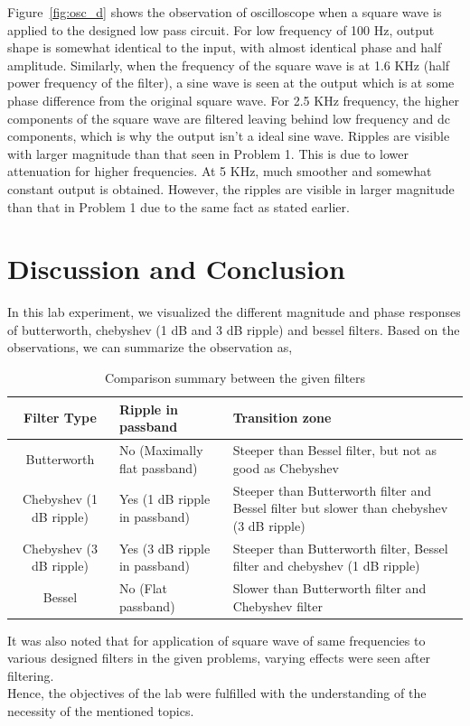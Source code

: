 \documentclass{lab_sheet}
\begin{document}
Figure~\ref{fig:osc_d} shows the observation of oscilloscope when a square wave is applied to the designed low pass circuit. For low frequency of 100 Hz, output shape is somewhat identical to the input, with almost identical phase and half amplitude.  Similarly, when the frequency of the square wave is at 1.6 KHz (half power frequency of the filter), a sine wave is seen at the output which is at some phase difference from the original square wave. For 2.5 KHz frequency, the higher components of the square wave are filtered leaving behind low frequency and dc components, which is why the output isn't a ideal sine wave. Ripples are visible with larger magnitude than that seen in Problem 1. This is due to lower attenuation for higher frequencies.  At 5 KHz, much smoother and somewhat constant output is obtained. However, the ripples are visible in larger magnitude than that in Problem 1 due to the same fact as stated earlier.

\section{Discussion and Conclusion}
In this lab experiment, we visualized the different magnitude and phase responses of butterworth, chebyshev (1 dB and 3 dB ripple) and bessel filters. Based on the observations, we can summarize the observation as,
\begin{table}[H]
   \centering
   \begin{tabular}{|c|M{3.5cm}|M{6.5cm}|}
   \hline
   \textbf{Filter Type}             & \textbf{Ripple in passband}           & \textbf{Transition zone}                                                                           \\ \hline\hline
   Butterworth              & No (Maximally flat passband)  & Steeper than Bessel filter, but not as good as Chebyshev                                  \\ \hline
   Chebyshev (1 dB ripple) & Yes (1 dB ripple in passband) & Steeper than Butterworth filter and Bessel filter but slower than chebyshev (3 dB ripple) \\ \hline
   Chebyshev (3 dB ripple) & Yes (3 dB ripple in passband) & Steeper than Butterworth filter, Bessel filter and chebyshev (1 dB ripple)                \\ \hline
   Bessel                  & No (Flat passband)            & Slower than Butterworth filter and Chebyshev filter                                       \\ \hline
   \end{tabular}
   \caption{Comparison summary between the given filters}
   \label{tbl:comp}
\end{table}
It was also noted that for application of square wave of same frequencies to various designed filters in the given problems, varying effects were seen after filtering. \\
Hence, the objectives of the lab were fulfilled with the understanding of the necessity of the mentioned topics.
\end{document}

